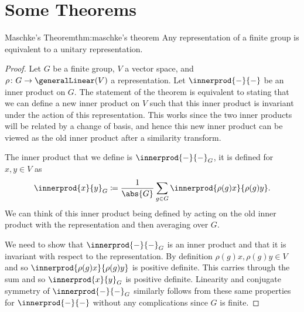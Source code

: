 \section{Some Theorems}
\begin{thm}{Maschke's Theorem}{thm:maschke's theorem}
    Any representation of a finite group is equivalent to a unitary
    representation.
    
    \begin{proof}
        Let \(G\) be a finite group, \(V\) a vector space, and \(\rho\colon
        G \to \generalLinear(V)\) a representation.
        Let \(\innerprod{-}{-}\) be an inner product on \(G\).
        The statement of the theorem is equivalent to stating that we can
        define a new inner product on \(V\) such that this inner product is invariant
        under the action of this representation.
        This works since the two inner products will be related by a change
        of basis, and hence this new inner product can be viewed as the old inner
        product after a similarity transform.
        
        The inner product that we define is \(\innerprod{-}{-}_G\), it is
        defined for \(x, y \in V\) as
        \begin{equation}
            \innerprod{x}{y}_G \coloneqq \frac{1}{\abs{G}} \sum_{g \in G}
            \innerprod{\rho(g)x}{\rho(g)y}.
        \end{equation}
        We can think of this inner product being defined by acting on the
        old inner product with the representation and then averaging over \(G\).
        
        We need to show that \(\innerprod{-}{-}_G\) is an inner product and
        that it is invariant with respect to the representation.
        By definition \(\rho(g)x, \rho(g)y \in V\) and so
        \(\innerprod{\rho(g)x}{\rho(g)y}\) is positive definite.
        This carries through the sum and so \(\innerprod{x}{y}_G\) is
        positive definite.
        Linearity and conjugate symmetry of \(\innerprod{-}{-}_G\) similarly
        follows from these same properties for \(\innerprod{-}{-}\) without any
        complications since \(G\) is finite.
        

\end{proof}
\end{thm}
